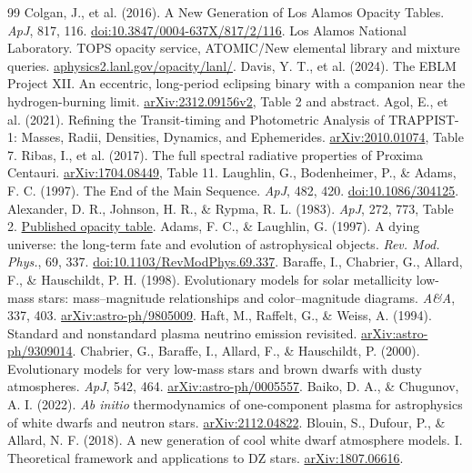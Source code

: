 \documentclass[11pt,letterpaper]{article}
\begin{document}
\begin{thebibliography}{99}\small
{} Colgan, J., et al. (2016).
A New Generation of Los Alamos Opacity Tables. \textit{ApJ}, 817, 116.
\href{https://doi.org/10.3847/0004-637X/817/2/116}{doi:10.3847/0004-637X/817/2/116}.
 Los Alamos National Laboratory. TOPS opacity service,
ATOMIC/New elemental library and mixture queries.
\href{https://aphysics2.lanl.gov/opacity/lanl/}{aphysics2.lanl.gov/opacity/lanl/}.
 Davis, Y. T., et al. (2024).
The EBLM Project XII. An eccentric, long-period eclipsing binary with a companion
near the hydrogen-burning limit.
\href{https://arxiv.org/pdf/2312.09156v2}{arXiv:2312.09156v2}, Table 2 and abstract.
 Agol, E., et al. (2021).
Refining the Transit-timing and Photometric Analysis of TRAPPIST-1:
Masses, Radii, Densities, Dynamics, and Ephemerides.
\href{https://arxiv.org/pdf/2010.01074}{arXiv:2010.01074}, Table 7.
 Ribas, I., et al. (2017).
The full spectral radiative properties of Proxima Centauri.
\href{https://arxiv.org/pdf/1704.08449}{arXiv:1704.08449}, Table 11.
 Laughlin, G., Bodenheimer, P., \& Adams, F. C. (1997).
The End of the Main Sequence. \emph{ApJ}, 482, 420.
\href{https://doi.org/10.1086/304125}{doi:10.1086/304125}.
 Alexander, D. R., Johnson, H. R., \& Rypma, R. L. (1983).
\emph{ApJ}, 272, 773, Table 2.
\href{https://adsabs.harvard.edu/pdf/1983ApJ...272..773A}{Published opacity table}.
 Adams, F. C., \& Laughlin, G. (1997).
A dying universe: the long-term fate and evolution of astrophysical objects.
\emph{Rev. Mod. Phys.}, 69, 337.
\href{https://doi.org/10.1103/RevModPhys.69.337}{doi:10.1103/RevModPhys.69.337}.
 Baraffe, I., Chabrier, G., Allard, F., \& Hauschildt, P. H. (1998).
Evolutionary models for solar metallicity low-mass stars: mass--magnitude
relationships and color--magnitude diagrams. \emph{A\&A}, 337, 403.
\href{https://arxiv.org/abs/astro-ph/9805009}{arXiv:astro-ph/9805009}.
 Haft, M., Raffelt, G., \& Weiss, A. (1994).
Standard and nonstandard plasma neutrino emission revisited.
\href{https://arxiv.org/abs/astro-ph/9309014}{arXiv:astro-ph/9309014}.
 Chabrier, G., Baraffe, I., Allard, F., \& Hauschildt, P. (2000).
Evolutionary models for very low-mass stars and brown dwarfs with dusty atmospheres.
\emph{ApJ}, 542, 464.
\href{https://arxiv.org/abs/astro-ph/0005557}{arXiv:astro-ph/0005557}.
 Baiko, D. A., \& Chugunov, A. I. (2022).
\emph{Ab initio} thermodynamics of one-component plasma for astrophysics of
white dwarfs and neutron stars.
\href{https://arxiv.org/abs/2112.04822}{arXiv:2112.04822}.
 Blouin, S., Dufour, P., \& Allard, N. F. (2018).
A new generation of cool white dwarf atmosphere models. I. Theoretical framework
and applications to DZ stars.
\href{https://arxiv.org/abs/1807.06616}{arXiv:1807.06616}.
\end{thebibliography}
\end{document}
